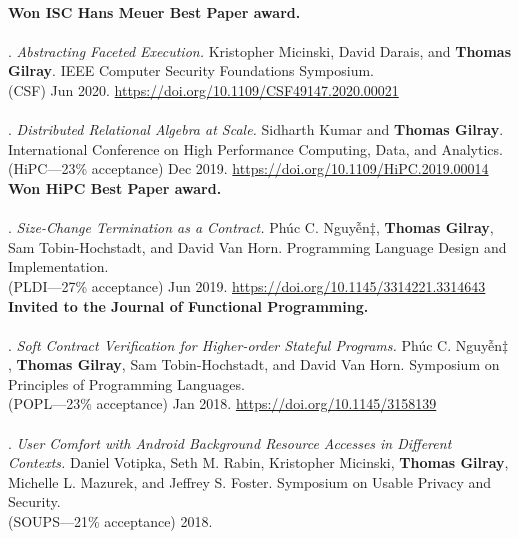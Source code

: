\\\textbf{Won ISC Hans Meuer Best Paper award.} \\ \vspace{-0.1cm}\\
\paper. \textit{Abstracting Faceted Execution.}
Kristopher Micinski, David Darais, and \textbf{Thomas Gilray}.
IEEE Computer Security Foundations Symposium.
\\(CSF) Jun 2020. \url{https://doi.org/10.1109/CSF49147.2020.00021}
\\ \vspace{-0.1cm}\\
\paper. \textit{Distributed Relational Algebra at Scale.}
Sidharth Kumar and \textbf{Thomas Gilray}.
International Conference on High Performance Computing, Data, and Analytics.
\\(HiPC---23\% acceptance) Dec 2019. \url{https://doi.org/10.1109/HiPC.2019.00014}
\\\textbf{Won HiPC Best Paper award.} \\ \vspace{-0.1cm}\\
\paper. \textit{Size-Change Termination as a Contract.}
Phúc C. Nguyễn$\ddagger$, \textbf{Thomas Gilray}, Sam Tobin-Hochstadt, and David Van Horn.
Programming Language Design and Implementation.
\\(PLDI---27\% acceptance) Jun 2019. \url{https://doi.org/10.1145/3314221.3314643}
\\\textbf{Invited to the Journal of Functional Programming.} \\ \vspace{-0.1cm}\\
\paper. \textit{Soft Contract Verification for Higher-order Stateful Programs.}
Phúc C. Nguyễn$\ddagger$, \textbf{Thomas Gilray}, Sam Tobin-Hochstadt, and David Van Horn.
Symposium on Principles of Programming Languages.
\\(POPL---23\% acceptance) Jan 2018. \url{https://doi.org/10.1145/3158139}
\\ \vspace{-0.1cm}\\
\paper. \textit{User Comfort with Android Background Resource Accesses in Different Contexts.}
Daniel Votipka, Seth M. Rabin, Kristopher Micinski, \textbf{Thomas Gilray}, Michelle L. Mazurek, and Jeffrey S. Foster.
Symposium on Usable Privacy and Security.
\\(SOUPS---21\% acceptance) 2018.
\\ \vspace{-0.1cm}\\
